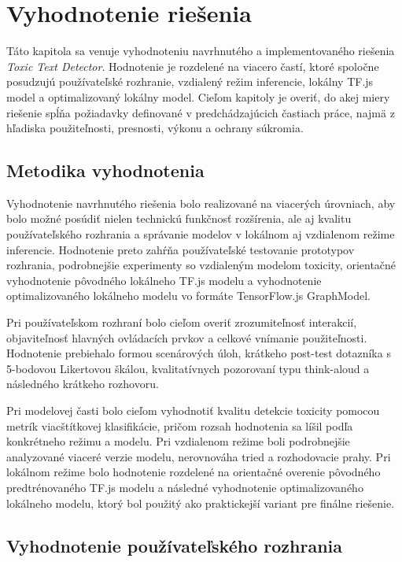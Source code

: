 \chapter{Vyhodnotenie riešenia}

Táto kapitola sa venuje vyhodnoteniu navrhnutého a implementovaného riešenia \textit{Toxic Text Detector}. Hodnotenie je rozdelené na viacero častí, ktoré spoločne posudzujú používateľské rozhranie, vzdialený režim inferencie, lokálny TF.js model a optimalizovaný lokálny model. Cieľom kapitoly je overiť, do akej miery riešenie spĺňa požiadavky definované v predchádzajúcich častiach práce, najmä z hľadiska použiteľnosti, presnosti, výkonu a ochrany súkromia.

\section{Metodika vyhodnotenia}
Vyhodnotenie navrhnutého riešenia bolo realizované na viacerých úrovniach, aby bolo možné posúdiť nielen technickú funkčnosť rozšírenia, ale aj kvalitu používateľského rozhrania a správanie modelov v lokálnom aj vzdialenom režime inferencie. Hodnotenie preto zahŕňa používateľské testovanie prototypov rozhrania, podrobnejšie experimenty so vzdialeným modelom toxicity, orientačné vyhodnotenie pôvodného lokálneho TF.js modelu a vyhodnotenie optimalizovaného lokálneho modelu vo formáte TensorFlow.js GraphModel.

Pri používateľskom rozhraní bolo cieľom overiť zrozumiteľnosť interakcií, objaviteľnosť hlavných ovládacích prvkov a celkové vnímanie použiteľnosti. Hodnotenie prebiehalo formou scenárových úloh, krátkeho post-test dotazníka s 5-bodovou Likertovou škálou, kvalitatívnych pozorovaní typu think-aloud a následného krátkeho rozhovoru.

Pri modelovej časti bolo cieľom vyhodnotiť kvalitu detekcie toxicity pomocou metrík viacštítkovej klasifikácie, pričom rozsah hodnotenia sa líšil podľa konkrétneho režimu a modelu. Pri vzdialenom režime boli podrobnejšie analyzované viaceré verzie modelu, nerovnováha tried a rozhodovacie prahy. Pri lokálnom režime bolo hodnotenie rozdelené na orientačné overenie pôvodného predtrénovaného TF.js modelu a následné vyhodnotenie optimalizovaného lokálneho modelu, ktorý bol použitý ako praktickejší variant pre finálne riešenie.

\section{Vyhodnotenie používateľského rozhrania}

